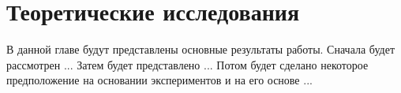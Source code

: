 \chapter{Теоретические исследования}
\label{chapter2}

В данной главе будут представлены основные результаты работы. Сначала будет рассмотрен ... Затем будет представлено ... Потом будет сделано некоторое предположение на основании экспериментов и на его основе ... 
